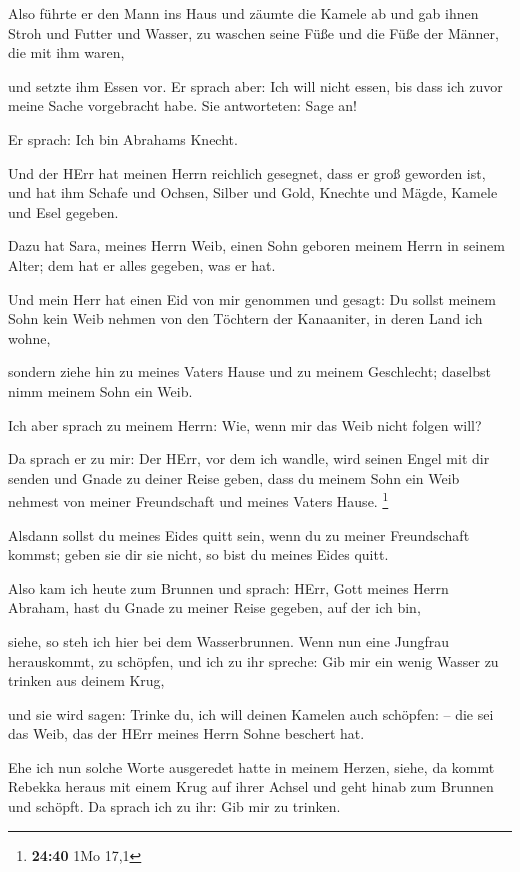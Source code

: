  Also führte er den Mann ins Haus und zäumte die Kamele ab
und gab ihnen Stroh und Futter und Wasser, zu waschen seine Füße und die
Füße der Männer, die mit ihm waren,

 und setzte ihm Essen vor. Er sprach aber: Ich will nicht
essen, bis dass ich zuvor meine Sache vorgebracht habe. Sie antworteten:
Sage an!

 Er sprach: Ich bin Abrahams Knecht.

 Und der HErr hat meinen Herrn reichlich gesegnet, dass er
groß geworden ist, und hat ihm Schafe und Ochsen, Silber und Gold,
Knechte und Mägde, Kamele und Esel gegeben.

 Dazu hat Sara, meines Herrn Weib, einen Sohn geboren
meinem Herrn in seinem Alter; dem hat er alles gegeben, was er hat.

 Und mein Herr hat einen Eid von mir genommen und gesagt:
Du sollst meinem Sohn kein Weib nehmen von den Töchtern der Kanaaniter,
in deren Land ich wohne,

 sondern ziehe hin zu meines Vaters Hause und zu meinem
Geschlecht; daselbst nimm meinem Sohn ein Weib.

 Ich aber sprach zu meinem Herrn: Wie, wenn mir das Weib
nicht folgen will?

 Da sprach er zu mir: Der HErr, vor dem ich wandle, wird
seinen Engel mit dir senden und Gnade zu deiner Reise geben, dass du
meinem Sohn ein Weib nehmest von meiner Freundschaft und meines Vaters
Hause. \footnote{\textbf{24:40} 1Mo 17,1}

 Alsdann sollst du meines Eides quitt sein, wenn du zu
meiner Freundschaft kommst; geben sie dir sie nicht, so bist du meines
Eides quitt.

 Also kam ich heute zum Brunnen und sprach: HErr, Gott
meines Herrn Abraham, hast du Gnade zu meiner Reise gegeben, auf der ich
bin,

 siehe, so steh ich hier bei dem Wasserbrunnen. Wenn nun
eine Jungfrau herauskommt, zu schöpfen, und ich zu ihr spreche: Gib mir
ein wenig Wasser zu trinken aus deinem Krug,

 und sie wird sagen: Trinke du, ich will deinen Kamelen
auch schöpfen: -- die sei das Weib, das der HErr meines Herrn Sohne
beschert hat.

 Ehe ich nun solche Worte ausgeredet hatte in meinem
Herzen, siehe, da kommt Rebekka heraus mit einem Krug auf ihrer Achsel
und geht hinab zum Brunnen und schöpft. Da sprach ich zu ihr: Gib mir zu
trinken.

